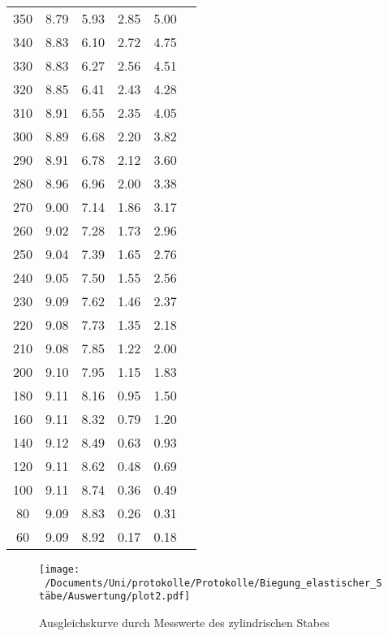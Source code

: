 \begin{table}
\begin{tabular}{c c c c c c}
    350 & 8.79 & 5.93 & 2.85 & 5.00 \\
    340 & 8.83 & 6.10 & 2.72 & 4.75 \\
    330 & 8.83 & 6.27 & 2.56 & 4.51 \\
    320 & 8.85 & 6.41 & 2.43 & 4.28 \\
    310 & 8.91 & 6.55 & 2.35 & 4.05 \\
    300 & 8.89 & 6.68 & 2.20 & 3.82 \\
    290 & 8.91 & 6.78 & 2.12 & 3.60 \\
    280 & 8.96 & 6.96 & 2.00 & 3.38 \\
    270 & 9.00 & 7.14 & 1.86 & 3.17 \\
    260 & 9.02 & 7.28 & 1.73 & 2.96 \\
    250 & 9.04 & 7.39 & 1.65 & 2.76 \\
    240 & 9.05 & 7.50 & 1.55 & 2.56 \\
    230 & 9.09 & 7.62 & 1.46 & 2.37 \\
    220 & 9.08 & 7.73 & 1.35 & 2.18 \\
    210 & 9.08 & 7.85 & 1.22 & 2.00 \\
    200 & 9.10 & 7.95 & 1.15 & 1.83 \\
    180 & 9.11 & 8.16 & 0.95 & 1.50 \\
    160 & 9.11 & 8.32 & 0.79 & 1.20 \\
    140 & 9.12 & 8.49 & 0.63 & 0.93 \\
    120 & 9.11 & 8.62 & 0.48 & 0.69 \\
    100 & 9.11 & 8.74 & 0.36 & 0.49 \\
    80 & 9.09 & 8.83 & 0.26 & 0.31 \\
    60 & 9.09 & 8.92 & 0.17 & 0.18 \\
    \bottomrule
  \end{tabular}
\end{table}

\begin{figure}
  \centering
  \texttt{[image: ~/Documents/Uni/protokolle/Protokolle/Biegung\_elastischer\_Stäbe/Auswertung/plot2.pdf]}
  \caption{Ausgleichskurve durch Messwerte des zylindrischen Stabes}
  \label{fig:kurveZyl}
\end{figure}


